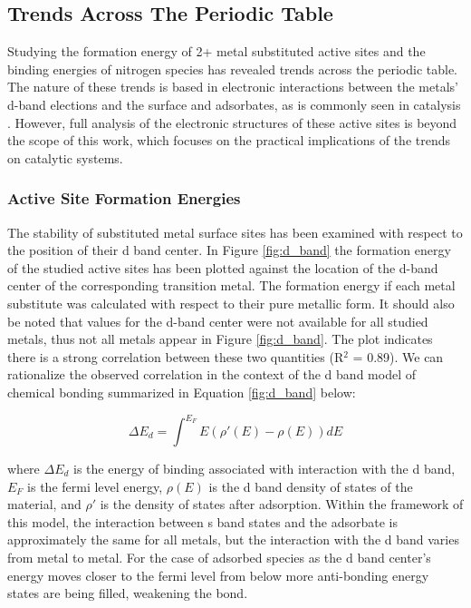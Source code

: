 \subsection{Trends Across The Periodic Table}

Studying the formation energy of 2+ metal substituted active sites and the binding energies of nitrogen species has revealed trends across the periodic table. The nature of these trends is based in electronic interactions between the metals' d-band elections and the surface and adsorbates, as is commonly seen in catalysis \cite{Hammer_2000,Nilsson_2008, Greeley_2002}. However, full analysis of the electronic structures of these active sites is beyond the scope of this work, which focuses on the practical implications of the trends on catalytic systems.

\subsubsection{Active Site Formation Energies}

The stability of substituted metal surface sites has been examined with respect to the position of their d band center. In Figure \ref{fig:d_band} the formation energy of the studied active sites has been plotted against the location of the d-band center of the corresponding transition metal. The formation energy if each metal substitute was calculated with respect to their pure metallic form. It should also be noted that values for the d-band center were not available for all studied metals, thus not all metals appear in Figure \ref{fig:d_band}. The plot indicates there is a strong correlation between these two quantities (R$^2$ = 0.89). We can rationalize the observed correlation in the context of the d band model of chemical bonding\cite{Nilsson_2008} summarized in Equation \ref{fig:d_band} below:

\begin{equation}
    \Delta E_d = \int^{E_F} E(\rho'(E) - \rho(E))dE
    \label{eq:d_band}
\end{equation}

where $\Delta E_d$ is the energy of binding associated with interaction with the d band, $E_F$ is the fermi level energy, $\rho(E)$ is the d band density of states of the material, and $\rho'$ is the density of states after adsorption. Within the framework of this model, the interaction between s band states and the adsorbate is approximately the same for all metals, but the interaction with the d band varies from metal to metal. For the case of adsorbed species as the d band center's energy moves closer to the fermi level from below more anti-bonding energy states are being filled, weakening the bond.

